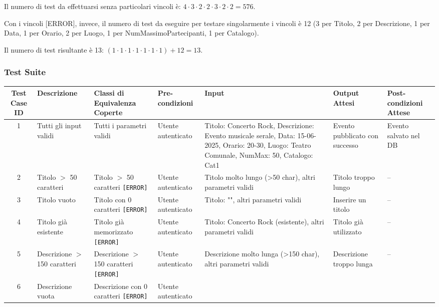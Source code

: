 \noindent Il numero di test da effettuarsi senza particolari vincoli è: $4 \cdot 3 \cdot 2 \cdot 2 \cdot 3 \cdot 2 \cdot 2 = 576$.

\noindent Con i vincoli [ERROR], invece, il numero di test da eseguire per testare singolarmente i vincoli è 12 (3 per Titolo, 2 per Descrizione, 1 per Data, 1 per Orario, 2 per Luogo, 1 per NumMassimoPartecipanti, 1 per Catalogo).

\noindent Il numero di test risultante è 13: $(1 \cdot 1 \cdot 1 \cdot 1 \cdot 1 \cdot 1 \cdot 1) + 12 = 13$.

\subsubsection*{Test Suite}

\begin{table}[H]
	\centering
	\tiny
	\renewcommand{\arraystretch}{1.4}
	\begin{tabular}{|c|p{2.5cm}|p{2.8cm}|p{1.5cm}|p{2.8cm}|p{2cm}|p{1.8cm}|}
		\hline
		\textbf{Test Case ID} & \textbf{Descrizione} & \textbf{Classi di Equivalenza Coperte} & \textbf{Pre-condizioni} & \textbf{Input} & \textbf{Output Attesi} & \textbf{Post-condizioni Attese} \\
		\hline
		1 & Tutti gli input validi & Tutti i parametri validi & Utente autenticato &
		Titolo: Concerto Rock, Descrizione: Evento musicale serale, Data: 15-06-2025, Orario: 20-30, Luogo: Teatro Comunale, NumMax: 50, Catalogo: Cat1 &
		Evento pubblicato con successo & Evento salvato nel DB \\
		\hline
		2 & Titolo $>$ 50 caratteri & Titolo $>$ 50 caratteri \texttt{[ERROR]} & Utente autenticato &
		Titolo molto lungo (>50 char), altri parametri validi &
		Titolo troppo lungo & -- \\
		\hline
		3 & Titolo vuoto & Titolo con 0 caratteri \texttt{[ERROR]} & Utente autenticato &
		Titolo: "", altri parametri validi &
		Inserire un titolo & -- \\
		\hline
		4 & Titolo già esistente & Titolo già memorizzato \texttt{[ERROR]} & Utente autenticato &
		Titolo: Concerto Rock (esistente), altri parametri validi &
		Titolo già utilizzato & -- \\
		\hline
		5 & Descrizione $>$ 150 caratteri & Descrizione $>$ 150 caratteri \texttt{[ERROR]} & Utente autenticato &
		Descrizione molto lunga (>150 char), altri parametri validi &
		Descrizione troppo lunga & -- \\
		\hline
		6 & Descrizione vuota & Descrizione con 0 caratteri \texttt{[ERROR]} & Utente autenticato &

\end{tabular}
\end{table}
